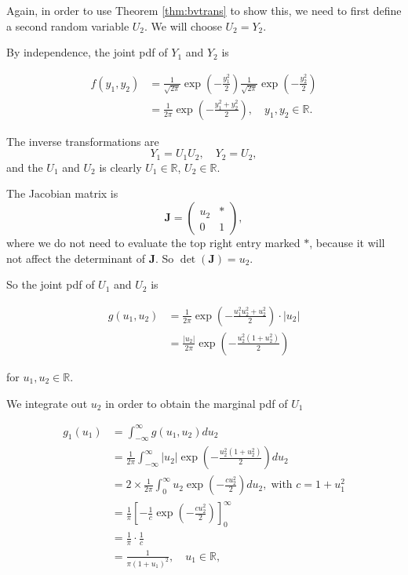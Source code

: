 \documentclass[]{book}
\theoremstyle{definition}
\theoremstyle{definition}
\theoremstyle{definition}
\theoremstyle{remark}
\begin{document}
\iffalse{} {Proof. } \fi{}Again, in order to use Theorem
\ref{thm:bvtrans} to show this, we need to first define a second random
variable \(U_2\). We will choose \(U_2 = Y_2\).

By independence, the joint pdf of \(Y_1\) and \(Y_2\) is

\begin{align*}
f(y_1, y_2) &= \frac{1}{\sqrt{2 \pi}} \exp\left(-\frac{y_1^2}{2}\right)
  \frac{1}{\sqrt{2 \pi}} \exp\left(-\frac{y_2^2}{2}\right) \\
  &= \frac{1}{2 \pi} \exp \left(-\frac{y_1^2 + y_2^2}{2} \right),
  \quad y_1, y_2 \in \mathbb{R}.
\end{align*}

The inverse transformations are \[Y_1 = U_1 U_2, \quad Y_2 = U_2,\] and
the \(U_1\) and \(U_2\) is clearly \(U_1 \in \mathbb{R}\),
\(U_2 \in \mathbb{R}\).

The Jacobian matrix is \[\bm J = \begin{pmatrix}
  u_2 & * \\
  0 & 1
  \end{pmatrix},\] where we do not need to evaluate the top right entry
marked \(*\), because it will not affect the determinant of \(\bm J\).
So \(\det(\bm J) = u_2\).

So the joint pdf of \(U_1\) and \(U_2\) is

\begin{align*}
g(u_1, u_2) &= \frac{1}{2 \pi} \exp \left(-\frac{u_1^2 u_2^2 + u_2^2}{2} \right) 
\cdot |u_2| \\
&= \frac{|u_2|}{2 \pi} \exp \left(-\frac{u_2^2(1 + u_2^2)}{2} \right) 
\end{align*}

for \(u_1, u_2 \in \mathbb{R}\).

We integrate out \(u_2\) in order to obtain the marginal pdf of \(U_1\)

\begin{align*}
g_1(u_1) &= \int_{-\infty}^\infty g(u_1, u_2) du_2 \\
&= \frac{1}{2 \pi}  \int_{-\infty}^\infty |u_2| \exp \left(-\frac{u_2^2(1 + u_2^2)}{2} \right)  du_2 \\
&= 2 \times \frac{1}{2 \pi} 
\int_{0}^\infty u_2 \exp \left(-\frac{c u_2^2}{2} \right)  du_2,  \; \text{with $c = 1 + u_1^2$} \\
&= \frac{1}{\pi} \left[-\frac{1}{c} \exp\left(-\frac{c u_2^2}{2}\right)\right]_0^\infty \\
&= \frac{1}{\pi} \cdot \frac{1}{c} \\
&= \frac{1}{\pi (1 + u_1)^2}, \quad u_1 \in \mathbb{R},
\end{align*}
\end{document}
